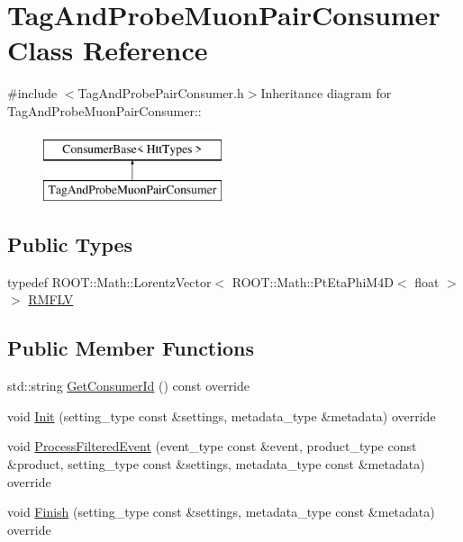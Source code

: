 \hypertarget{classTagAndProbeMuonPairConsumer}{
\section{TagAndProbeMuonPairConsumer Class Reference}
\label{classTagAndProbeMuonPairConsumer}
}


{\ttfamily \#include $<$TagAndProbePairConsumer.h$>$}Inheritance diagram for TagAndProbeMuonPairConsumer::\begin{figure}[H]
\begin{center}
\leavevmode
\includegraphics[height=2cm]{classTagAndProbeMuonPairConsumer}
\end{center}
\end{figure}
\subsection*{Public Types}
\begin{DoxyCompactItemize}
\item 
typedef ROOT::Math::LorentzVector$<$ ROOT::Math::PtEtaPhiM4D$<$ float $>$ $>$ \hyperlink{classTagAndProbeMuonPairConsumer_aab60ab5bd356a7bcf703c77348363bdc}{RMFLV}
\end{DoxyCompactItemize}
\subsection*{Public Member Functions}
\begin{DoxyCompactItemize}
\item 
std::string \hyperlink{classTagAndProbeMuonPairConsumer_a2280550fe9cb5ca7c9e9309d598fa50f}{GetConsumerId} () const override
\item 
void \hyperlink{classTagAndProbeMuonPairConsumer_a1d466581f46cd6e9d493f750d97fad7b}{Init} (setting\_\-type const \&settings, metadata\_\-type \&metadata) override
\item 
void \hyperlink{classTagAndProbeMuonPairConsumer_a7b9899bcda048210461c98f5d8364b49}{ProcessFilteredEvent} (event\_\-type const \&event, product\_\-type const \&product, setting\_\-type const \&settings, metadata\_\-type const \&metadata) override
\item 
void \hyperlink{classTagAndProbeMuonPairConsumer_abe8dd79c624d280d91bcd872c475a676}{Finish} (setting\_\-type const \&settings, metadata\_\-type const \&metadata) override
\end{DoxyCompactItemize}


